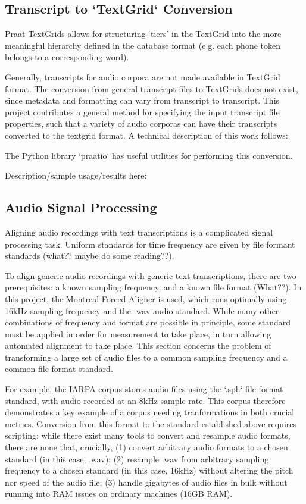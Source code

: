 \documentclass[11pt]{article}
\begin{document}
\subsection{Transcript to `TextGrid` Conversion}

Praat\cite{noauthor_praat_nodate} TextGrids allows for structuring ‘tiers’ in the TextGrid into the more meaningful hierarchy defined in the database format (e.g. each phone token belongs to a corresponding word).

Generally, transcripts for audio corpora are not made available in TextGrid format. The conversion from general transcript files to TextGrids does not exist, since metadata and formatting can vary from transcript to transcript. This project contributes a general method for specifying the input transcript file properties, such that a variety of audio corporas can have their transcripts converted to the textgrid format. A technical description of this work follows:

The Python library `praatio` \cite{tim_mahrt_praatio_2016} has useful utilities for performing this conversion.

Description/sample usage/results here:

\subsection{Audio Signal Processing}

Aligning audio recordings with text transcriptions is a complicated signal processing task. Uniform standards for time frequency are given by file formant standards (what?? maybe do some reading??).

To align generic audio recordings with generic text transcriptions, there are two prerequisites: a known sampling frequency, and a known file format (What??). In this project, the Montreal Forced Aligner is used, which runs optimally using 16kHz sampling frequency and the .wav audio standard. While many other combinations of frequency and format are possible in principle, some standard must be applied in order for measurement to take place, in turn allowing automated alignment to take place. This section concerns the problem of transforming a large set of audio files to a common sampling frequency and a common file format standard.

For example, the IARPA corpus stores audio files using the `.sph` file format standard, with audio recorded at an 8kHz sample rate. This corpus therefore demonstrates a key example of a corpus needing tranformations in both crucial metrics. Conversion from this format to the standard established above requires scripting: while there exist many tools to convert and resample audio formats, there are none that, crucially, (1) convert arbitrary audio formats to a chosen standard (in this case, .wav); (2) resample .wav from arbitrary sampling frequency to a chosen standard (in this case, 16kHz) without altering the pitch nor speed of the audio file; (3) handle gigabytes of audio files in bulk without running into RAM issues on ordinary machines (16GB RAM).
\end{document}

